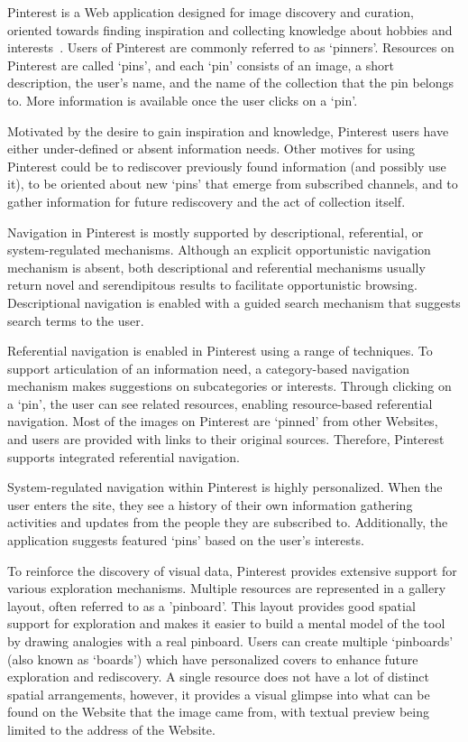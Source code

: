 \documentclass[review]{elsarticle}
\newcommand{\feature}[1]{{\ttfamily#1}}
\begin{document}
{{Pinterest is a Web application designed for image discovery and curation, oriented towards finding inspiration and collecting knowledge about hobbies and interests~\cite{gilbert2013need,zarro2012pinterest,ottoni2013ladies}.  Users of Pinterest are commonly referred to as `pinners'. Resources on Pinterest are called `pins', and each `pin' consists of an image, a short description, the user's name, and the name of the collection that the pin belongs to. More information is available once the user clicks on a `pin'.

Motivated by the desire to gain inspiration and knowledge, Pinterest users have either under-defined or absent information needs. Other motives for using Pinterest could be to rediscover previously found information (and possibly use it), to be oriented about new `pins' that emerge from subscribed channels, and to gather information for future rediscovery and the act of collection itself.

Navigation in Pinterest is mostly supported by descriptional, referential, or system-regulated mechanisms. Although an explicit \feature{opportunistic navigation mechanism} is absent, both descriptional and referential mechanisms usually return novel and serendipitous results to facilitate opportunistic browsing. Descriptional navigation is enabled with a \feature{guided search} mechanism that suggests search terms to the user. 

Referential navigation is enabled in Pinterest using a range of techniques. To support articulation of an information need, a \feature{category-based} navigation mechanism makes suggestions on subcategories or interests. Through clicking on a `pin', the user can see related resources, enabling \feature{resource-based} referential navigation. Most of the images on Pinterest are `pinned' from other Websites, and users are provided with links to their original sources. Therefore, Pinterest supports \feature{integrated} referential navigation.

System-regulated navigation within Pinterest is highly personalized. When the user enters the site, they see a history of their own information gathering activities and updates from the people they are subscribed to. Additionally, the application suggests \feature{featured} `pins' based on the user's interests.

To reinforce the discovery of visual data, Pinterest provides extensive support for various exploration mechanisms. Multiple resources are represented in a \feature{gallery layout}, often referred to as a 'pinboard'. This layout provides good spatial support for exploration and makes it easier to build a mental model of the tool by drawing analogies with a real pinboard. Users can create multiple `pinboards' (also known as `boards') which have \feature{personalized} covers to enhance future exploration and rediscovery.
%
A single resource does not have a lot of distinct spatial arrangements, however, it provides a visual glimpse into what can be found on the Website that the image came from, with \feature{textual preview} being limited to the address of the Website. 

}}
\end{document}
